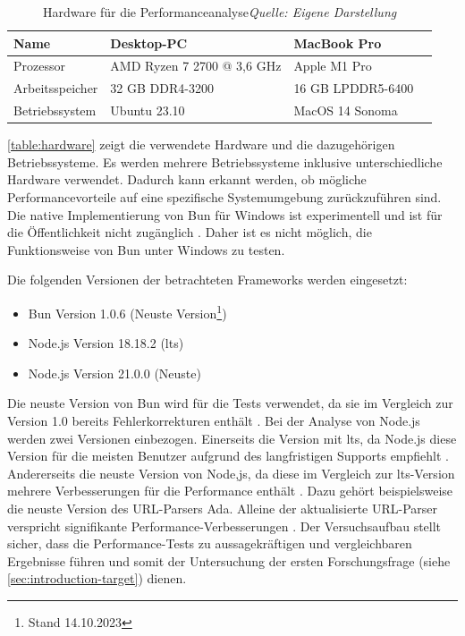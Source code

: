 \begin{table}[h]
	\caption[Hardware für die Performanceanalyse]{Hardware für die Performanceanalyse\protect\linebreak\textit{Quelle: Eigene Darstellung}}
	\label{table:hardware}
	\centering
	\begin{tabular}{|p{4.5cm}|p{4.5cm}|p{4.5cm}|p{4.5cm}|}
		\hline
		Name & Desktop-PC & MacBook Pro \\
		\hline
		Prozessor & AMD Ryzen 7 2700 @ 3,6 GHz & Apple M1 Pro \\
		\hline
		Arbeitsspeicher & 32 GB DDR4-3200 & 16 GB LPDDR5-6400 \\
		\hline
		Betriebssystem & Ubuntu 23.10 & MacOS 14 Sonoma \\
		\hline
	\end{tabular}
\end{table}

\noindent
\autoref{table:hardware} zeigt die verwendete Hardware und die dazugehörigen Betriebssysteme. Es werden mehrere Betriebssysteme inklusive unterschiedliche Hardware verwendet. Dadurch kann erkannt werden, ob mögliche Performancevorteile auf eine spezifische Systemumgebung zurückzuführen sind. Die native Implementierung von Bun für Windows ist experimentell und ist für die Öffentlichkeit nicht zugänglich \cite{Verhelst.2023}. Daher ist es nicht möglich, die Funktionsweise von Bun unter Windows zu testen.

\noindent
Die folgenden Versionen der betrachteten Frameworks werden eingesetzt:
\begin{itemize}
	\item Bun Version 1.0.6 (Neuste Version\footnote{Stand 14.10.2023\label{footnote:Stand}})
	\item Node.js Version 18.18.2 (\ac{lts}) 
	\item Node.js Version 21.0.0 (Neuste)
\end{itemize}

\noindent
Die neuste Version von Bun wird für die Tests verwendet, da sie im Vergleich zur Version 1.0 bereits Fehlerkorrekturen enthält \cite{Sumner.2023b}. Bei der Analyse von Node.js werden zwei Versionen einbezogen. Einerseits die Version mit \ac{lts}, da Node.js diese Version für die meisten Benutzer aufgrund des langfristigen Supports empfiehlt \cite{OpenJSFoundation.o.J.}. Andererseits die neuste Version von Node,js, da diese im Vergleich zur \ac{lts}-Version mehrere Verbesserungen für die Performance enthält \cite{OpenJSFoundation.2023b}. Dazu gehört beispielsweise die neuste Version des URL-Parsers Ada. Alleine der aktualisierte URL-Parser verspricht signifikante Performance-Verbesserungen \cite{OpenJSFoundation.2023}.\newline
Der Versuchsaufbau stellt sicher, dass die Performance-Tests zu aussagekräftigen und vergleichbaren Ergebnisse führen und somit der Untersuchung der ersten Forschungsfrage (siehe \autoref{sec:introduction-target}) dienen.


